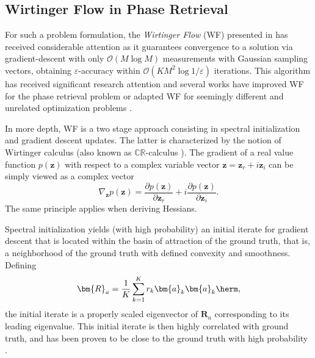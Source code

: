\subsection{Wirtinger Flow in Phase Retrieval}
For such a problem formulation, the \textit{Wirtinger Flow} (WF) presented in \cite{Candes2015a_phaseretrievalWF} has received considerable attention as it guarantees convergence to a solution via gradient-descent with only $\mathcal{O}(M\log M)$ measurements with Gaussian sampling vectors, obtaining  $\varepsilon$-accuracy within $\mathcal{O}(KM^2\log1/\varepsilon)$ iterations. 
This algorithm has received significant research attention and several works have improved WF for the phase retrieval problem \cite{Chen2015truncatedwf,Zhang2017reshapedwf,Bostan2018AcceleratedWF} or adapted WF for seemingly different and unrelated optimization problems \cite{Dong2018blinddemixingwf,Dong2018otacompwf}. 

In more depth, WF is a two stage approach consisting in spectral initialization 
and gradient descent updates. The latter is characterized by the notion of Wirtinger calculus
(also known as $\mathbb{CR}$-calculus \cite{Kreutz2009wirtinger}). The gradient
of a real value function $p(\bm{z})$ with respect to a complex variable vector
$\bm{z}=\mathbf{z}_r + i \bm{z}_i$
can be simply viewed as a complex vector 
\begin{equation}
\nabla_{\bm{z}} p(\bm{z}) = \frac{ \partial  p(\bm{z}) }{\partial \bm{z}_r}
+ i \frac{ \partial p(\bm{z}) }{\partial \bm{z}_i}.
\end{equation}
The same principle applies when deriving Hessians. 

Spectral initialization yields (with high probability) an initial iterate for gradient descent that is located within the basin of attraction of the ground truth, 
that is, a neighborhood of the ground truth with defined convexity and smoothness. Defining
\begin{equation}
\bm{R}_a=\frac{1}{K}\sum_{k=1}^K r_k\bm{a}_k\bm{a}_k\herm,
\end{equation}
the initial iterate is a properly scaled eigenvector of 
$\bm{R}_a$ corresponding to its leading eigenvalue. This initial iterate is then highly correlated with ground truth, and has been proven to be
close to the ground truth with high probability \cite{Candes2015a_phaseretrievalWF}.


